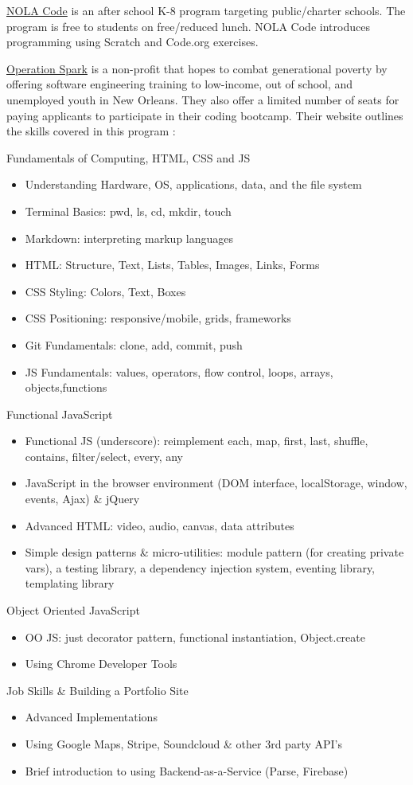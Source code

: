 \href{http://www.nolacode.org/}{NOLA Code} is an after school K-8 program targeting public/charter schools. The program is free to students on free/reduced lunch. NOLA Code introduces programming using Scratch and Code.org exercises.\par
\label{opsp}\href{https://operationspark.org/}{Operation Spark} is a non-profit that hopes to combat generational poverty by offering software engineering training to low-income, out of school, and unemployed youth in New Orleans. They also offer a limited number of seats for paying applicants to participate in their coding bootcamp. Their website outlines the skills covered in this program \cite{opspark}:\par
Fundamentals of Computing, HTML, CSS and JS
\begin{itemize}
	\item Understanding Hardware, OS, applications, data, and the file system
	\item Terminal Basics: pwd, ls, cd, mkdir, touch
	\item Markdown: interpreting markup languages
	\item HTML: Structure, Text, Lists, Tables, Images, Links, Forms
	\item CSS Styling: Colors, Text, Boxes
	\item CSS Positioning: responsive/mobile, grids, frameworks
	\item Git Fundamentals: clone, add, commit, push
	\item JS Fundamentals: values, operators, flow control, loops, arrays, objects,functions
\end{itemize}
Functional JavaScript
\begin{itemize}
	\item Functional JS (underscore): reimplement each, map, first, last, shuffle, contains, filter/select, every, any
	\item JavaScript in the browser environment (DOM interface, localStorage, window, events, Ajax) \& jQuery
	\item Advanced HTML: video, audio, canvas, data attributes
	\item Simple design patterns \& micro-utilities: module pattern (for creating private vars), a testing library, a dependency injection system, eventing library, templating library 
\end{itemize}
Object Oriented JavaScript
\begin{itemize}
	\item OO JS: just decorator pattern, functional instantiation, Object.create
	\item Using Chrome Developer Tools
\end{itemize}
Job Skills \& Building a Portfolio Site
\begin{itemize}
	\item Advanced Implementations
	\item Using Google Maps, Stripe, Soundcloud \& other 3rd party API’s
	\item Brief introduction to using Backend-as-a-Service (Parse, Firebase)
\end{itemize}

